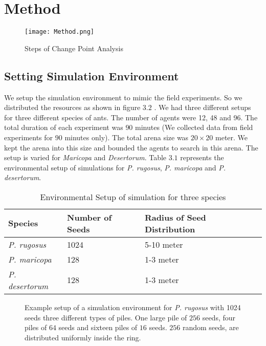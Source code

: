 \chapter{Method}
\begin{figure}[h]
	\texttt{[image: Method.png]}
	\caption{Steps of Change Point Analysis}
\end{figure}
\section{\label{section:Setting Simulation Environment}Setting Simulation Environment}
We setup the simulation environment to mimic the field experiments. So we distributed the resources as shown in figure $3.2$ . We had three different setups for three different species of ants. The number of agents were 12, 48 and 96. The total duration of each experiment was $90$ minutes (We collected data from field experiments for $90$ minutes only). The total arena size was $20\times20$ meter. We kept the arena into this size and bounded the agents to search in this arena.  The setup is varied for \textit{Maricopa} and \textit{Desertorum}. Table $3.1$ represents the environmental setup of simulations for \textit{P. rugosus}, \textit{P. maricopa} and \textit{P. desertorum}.
\begin{table}[h]
	\begin{tabular}{ |p{}|p{}|p{}| } 
		\hline
		\textbf{Species} & \textbf{Number of Seeds} & \textbf{Radius of Seed Distribution} \\
		\hline 
		\textit{P. rugosus} & 1024 & 5-10 meter\\ 
		\hline
		\textit{P. maricopa} & 128 & 1-3 meter\\ 
		\hline
		 \textit{P. desertorum} & 128 & 1-3 meter\\
		\hline
	\end{tabular}
	\caption{Environmental Setup of simulation for three species}
\end{table}
\begin{figure}[!h]
	\caption{Example setup of a simulation environment for \textit{P. rugosus} with 1024 seeds three different types of piles. One large pile of $256$ seeds, four piles of $64$ seeds and sixteen piles of $16$ seeds. $256$ random seeds, are distributed uniformly inside the ring. }
\end{figure}
